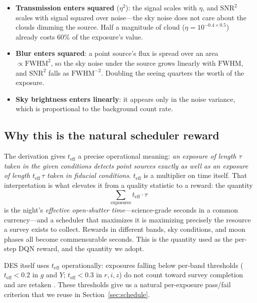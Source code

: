 \documentclass[11pt]{article}
\newcommand{\teff}{t_{\mathrm{eff}}}
\newcommand{\fwhm}{\mathrm{FWHM}}
\begin{document}
\begin{itemize}
  \item \textbf{Transmission enters squared} ($\eta^2$): the signal scales with
    $\eta$, and $\mathrm{SNR}^2$ scales with signal squared over noise---the sky
    noise does not care about the clouds dimming the source. Half a magnitude of
    cloud ($\eta = 10^{-0.4 \times 0.5}$) already costs 60\% of the exposure's value.
  \item \textbf{Blur enters squared}: a point source's flux is spread over an area
    $\propto \fwhm^2$, so the sky noise under the source grows linearly with
    $\fwhm$, and $\mathrm{SNR}^2$ falls as $\fwhm^{-2}$. Doubling the seeing
    quarters the worth of the exposure.
  \item \textbf{Sky brightness enters linearly}: it appears only in the noise
    variance, which is proportional to the background count rate.
\end{itemize}

\subsection{Why this is the natural scheduler reward}

The derivation gives $\teff$ a precise operational meaning: \emph{an exposure of
length $\tau$ taken in the given conditions detects point sources exactly as well as
an exposure of length $\teff\,\tau$ taken in fiducial conditions}. $\teff$ is a
multiplier on time itself. That interpretation is what elevates it from a quality
statistic to a reward: the quantity
\begin{equation}
  \sum_{\mathrm{exposures}} \teff \cdot \tau
  \label{eq:effective-seconds}
\end{equation}
is the night's \emph{effective open-shutter time}---science-grade seconds in a common
currency---and a scheduler that maximizes it is maximizing precisely the resource a
survey exists to collect. Rewards in different bands, sky conditions, and moon phases
all become commensurable seconds. This is the quantity \citet{terranova2023} used as
the per-step DQN reward, and the quantity we adopt.

DES itself uses $\teff$ operationally: exposures falling below per-band thresholds
($\teff < 0.2$ in $g$ and $Y$; $\teff < 0.3$ in $r,i,z$) do not count toward survey
completion and are retaken \citep{neilsen2019}. These thresholds give us a natural
per-exposure pass/fail criterion that we reuse in Section~\ref{sec:schedule}.
\end{document}
